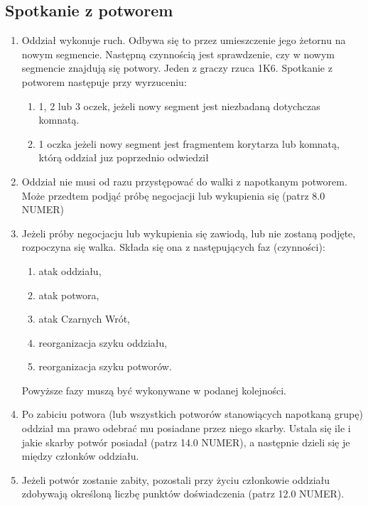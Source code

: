 \subsection{Spotkanie z potworem}
\begin{enumerate}
    \item
        Oddział wykonuje ruch.
        Odbywa się to przez umieszczenie jego żetornu na nowym segmencie.
        Następną czynnością jest sprawdzenie, czy w nowym segmencie znajdują się potwory.
        Jeden z graczy rzuca 1K6.
        Spotkanie z potworem następuje przy wyrzuceniu:
        \begin{enumerate}
            \item
                1, 2 lub 3 oczek, jeżeli nowy segment jest niezbadaną dotychczas komnatą.
            \item
                1 oczka jeżeli nowy segment jest fragmentem korytarza lub komnatą, którą oddział juz poprzednio odwiedził
        \end{enumerate}
    \item
        Oddział nie musi od razu przystępować do walki z napotkanym potworem.
        Może przedtem podjąć próbę negocjacji lub wykupienia się (patrz 8.0 NUMER)
    \item
        Jeżeli próby negocjacju lub wykupienia się zawiodą, lub nie zostaną podjęte, rozpoczyna się walka.
        Składa się ona z następujących faz (czynności):
        \begin{enumerate}
            \item
                atak oddziału,
            \item
                atak potwora,
            \item
                atak Czarnych Wrót,
            \item
                reorganizacja szyku oddziału,
            \item
                reorganizacja szyku potworów.
        \end{enumerate}
        Powyższe fazy muszą być wykonywane w podanej kolejności.
    \item
        Po zabiciu potwora (lub wszystkich potworów stanowiących napotkaną grupę) oddział ma prawo odebrać mu posiadane przez niego skarby.
        Ustala się ile i jakie skarby potwór posiadał (patrz 14.0 NUMER), a następnie dzieli się je między członków oddziału.
    \item
        Jeżeli potwór zostanie zabity, pozostali przy życiu członkowie oddziału zdobywają określoną liczbę punktów doświadczenia (patrz 12.0 NUMER).
\end{enumerate}


